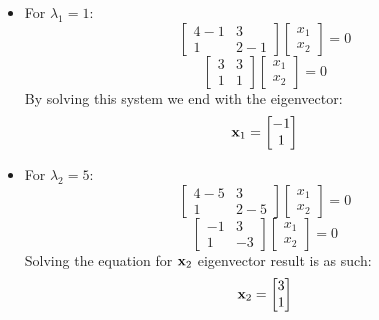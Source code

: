\begin{itemize}
    \item For $\lambda_1 = 1$:
        \begin{equation*}
            \begin{bmatrix}
                4 - 1 & 3 \\
                1 & 2 - 1
            \end{bmatrix}
            \begin{bmatrix}
                x_1 \\
                x_2
            \end{bmatrix} = 0
        \end{equation*}
        \begin{equation*}
            \begin{bmatrix}
                3 & 3 \\
                1 & 1
            \end{bmatrix}
            \begin{bmatrix}
                x_1 \\
                x_2
            \end{bmatrix} = 0
        \end{equation*}
        By solving this system we end with the eigenvector:
        \begin{equation*}
            \mathbf{x}_1 = 
            \begin{bmatrix}
                -1 \\
                1
            \end{bmatrix} 
        \end{equation*} 
    \item For $\lambda_2 = 5$:
    \begin{equation*}
        \begin{bmatrix}
            4 - 5 & 3 \\
            1 & 2 - 5
        \end{bmatrix}
        \begin{bmatrix}
            x_1 \\
            x_2
        \end{bmatrix} = 0
    \end{equation*}
    \begin{equation*}
        \begin{bmatrix}
            -1 & 3 \\
            1 & -3
        \end{bmatrix}
        \begin{bmatrix}
            x_1 \\
            x_2
        \end{bmatrix} = 0
    \end{equation*}
    Solving the equation for $\mathbf{x}_2$ eigenvector result is as such:
    \begin{equation*}
        \mathbf{x}_2 = 
        \begin{bmatrix}
            3 \\
            1
        \end{bmatrix} 
    \end{equation*} 
\end{itemize}

